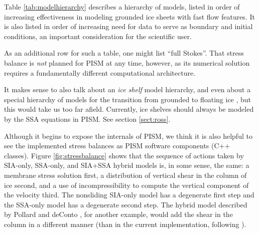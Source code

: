 \documentclass[titlepage,letterpaper,final]{scrartcl}
\begin{document}
Table \ref{tab:modelhierarchy} describes a hierarchy of models, listed in order of increasing effectiveness in modeling grounded ice sheets with fast flow features.  It is also listed in order of increasing need for data to serve as boundary and initial conditions, an important consideration for the scientific user.

As an additional row for such a table, one might list ``full Stokes''.  That stress balance is \emph{not} planned for PISM at any time, however, as its numerical solution requires a fundamentally different computational architecture.

It makes sense to also talk about an \emph{ice shelf} model hierarchy, and even about a special hierarchy of models for the transition from grounded to floating ice \cite{SchoofMarine1}, but this would take us too far afield.  Currently, ice shelves should always be modeled by the SSA equations in PISM.  See section \ref{sect:ross}.

Although it begins to expose the internals of PISM, we think it is also helpful to see the implemented stress balances as PISM software components (C++ classes).  Figure \ref{fig:stressbalance} shows that the sequence of actions taken by SIA-only, SSA-only, and SIA+SSA hybrid models is, in some sense, the same: a membrane stress solution first, a distribution of vertical shear in the column of ice second, and a use of incompressibility to compute the vertical component of the velocity third.  The nonsliding SIA-only model has a degenerate first step and the SSA-only model has a degenerate second step.  The hybrid model described by Pollard and deConto \cite{PollardDeConto}, for another example, would add the shear in the column in a different manner (than in the current implementation, following \cite{BBssasliding,Winkelmannetal2010TCD}).

\newenvironment{tightlist}{\begin{itemize}  \vspace{-0.15in}\addtolength{\itemsep}{-0.5\baselineskip} } {\vspace{-0.1in} \end{itemize}}

\newcommand{\nolist}[1]{[\emph{#1}] \vspace{0.1in}}
\end{document}
